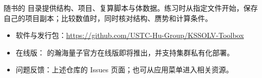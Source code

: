随书的  目录提供结构、项目、复算脚本与体数据。练习时从指定文件开始，保存自己的项目副本；比较数值时，同时核对结构、赝势和计算条件。

\vspace{\baselineskip}

\begin{itemize}
\item 软件与发行包：\url{https://github.com/USTC-Hu-Group/KSSOLV-Toolbox}
\item 在线版：\ksonline{} 的瀚海量子\regmark{}官方在线版即将推出，并支持集群私有化部署。
\item 问题反馈：上述仓库的 Issues 页面；也可从应用菜单进入相关资源。
\end{itemize}

\clearpage
